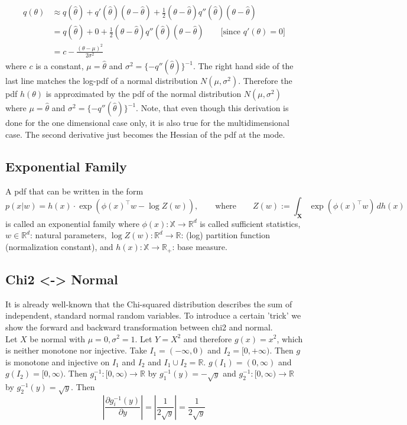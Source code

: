 \begin{align}
	q(\theta) &\approx q(\hat{\theta}) + q'(\hat{\theta})(\theta - \hat{\theta}) + \frac{1}{2}(\theta- \hat{\theta})q''(\hat{\theta}) (\theta - \hat{\theta})\\
	&= 	q(\hat{\theta}) + 0 +  \frac{1}{2}(\theta- \hat{\theta})q''(\hat{\theta}) (\theta - \hat{\theta}) \qquad \text{[since } q'(\theta) = 0]\\
	&= c - \frac{(\theta - \mu)^2}{2\sigma^2}
\end{align}
where $c$ is a constant, $\mu = \hat{\theta}$ and $\sigma^2 = \{-q''(\hat{\theta})\}^{-1}$. The right hand side of the last line matches the log-pdf of a normal distribution $N(\mu, \sigma^2)$. Therefore the pdf $h(\theta)$ is approximated by the pdf of the normal distribution $N(\mu, \sigma^2)$ where $\mu = \hat{\theta}$ and $\sigma^2 = \{-q''(\hat{\theta})\}^{-1}$. Note, that even though this derivation is done for the one dimensional case only, it is also true for the multidimensional case. The second derivative just becomes the Hessian of the pdf at the mode.

\subsection{Exponential Family}

A pdf that can be written in the form 
\begin{equation*}\label{EF}
p(x \vert w) = h(x)\cdot \exp\left(\phi(x)^\top w - \log Z(w) \right), \qquad\text{where}\qquad Z(w):= \int_{\mathbf{X}} \exp\left(\phi(x)^\top w\right) \,dh(x)
\end{equation*}
is called an exponential family where $\phi(x): \mathbb{X} \rightarrow \mathbb{R}^d$ is called sufficient statistics, $w \in \mathbb{R}^d$: natural parameters, $\log Z(w): \mathbb{R}^d \rightarrow \mathbb{R}$: (log) partition function (normalization constant), and $h(x): \mathbb{X} \rightarrow \mathbb{R}_{+}$: base measure.

\subsection{Chi2 <-> Normal}
\label{subsec:chi2-normal}

It is already well-known that the Chi-squared distribution describes the sum of independent, standard normal random variables. To introduce a certain 'trick' we show the forward and backward transformation between chi2 and normal.\\
Let $X$ be normal with $\mu = 0, \sigma^2 = 1$. Let $Y = X^2$ and therefore $g(x) = x^2$, which is neither monotone nor injective. Take $I_1 = (-\infty, 0)$ and $I_2 = [0, +\infty)$. Then $g$ is monotone and injective on $I_1$ and $I_2$ and $I_1 \cup I_2 = \mathbb{R}$. $g(I_1) = (0, \infty)$ and $g(I_2) = [0, \infty)$. Then $g_1^{-1}: [0, \infty) \rightarrow \mathbb{R}$ by $g_1^{-1}(y) = -\sqrt{y}$ and $g_2^{-1}: [0, \infty) \rightarrow \mathbb{R}$ by $g_2^{-1}(y) = \sqrt{y}$. Then
$$\left\vert \frac{\partial g_i^{-1}(y)}{\partial y} \right\vert = \left\vert \frac{1}{2 \sqrt{y}} \right\vert = \frac{1}{2 \sqrt{y}}$$


